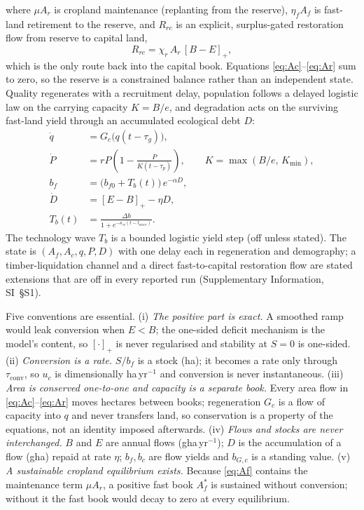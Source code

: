 \documentclass[preprint,12pt,authoryear]{elsarticle}
\newcommand{\pos}[1]{\left[#1\right]_+}
\newcommand{\tconv}{\tau_{\mathrm{conv}}}
\begin{document}
where $\mu A_r$ is cropland maintenance (replanting from the reserve), $\eta_f A_f$ is fast-land retirement to the reserve, and $R_{rc}$ is an explicit, surplus-gated restoration flow from reserve to capital land,
\begin{equation}\label{eq:Rrc}
R_{rc}=\chi_r\,A_r\,\pos{B-E},
\end{equation}
which is the only route back into the capital book. Equations \eqref{eq:Ac}--\eqref{eq:Ar} sum to zero, so the reserve is a constrained balance rather than an independent state. Quality regenerates with a recruitment delay, population follows a delayed logistic law \citep{Pearl1925,Hutchinson1948} on the carrying capacity $K=B/e$, and degradation acts on the surviving fast-land yield through an accumulated ecological debt $D$:
\begin{align}
\dot q&=G_c\big(q(t-\tau_g)\big),\label{eq:q}\\
\dot P&=rP\left(1-\frac{P}{K(t-\tau_p)}\right),\qquad K=\max(B/e,\,K_{\min}),\label{eq:P}\\
b_f&=\big(b_{f0}+T_b(t)\big)\,e^{-\alpha D},\label{eq:bf}\\
\dot D&=\pos{E-B}-\eta D,\label{eq:D}\\
T_b(t)&=\frac{\Delta b}{1+e^{-\kappa_w(t-t_{wave})}}.\label{eq:Tb}
\end{align}
The technology wave $T_b$ is a bounded logistic yield step (off unless stated). The state is $(A_f,A_c,q,P,D)$ with one delay each in regeneration and demography; a timber-liquidation channel and a direct fast-to-capital restoration flow are stated extensions that are off in every reported run (Supplementary Information, SI~\S S1).

Five conventions are essential. (i) \emph{The positive part is exact.} A smoothed ramp would leak conversion when $E<B$; the one-sided deficit mechanism is the model's content, so $\pos{\cdot}$ is never regularised and stability at $S=0$ is one-sided. (ii) \emph{Conversion is a rate.} $S/b_f$ is a stock (ha); it becomes a rate only through $\tconv$, so $u_c$ is dimensionally ha\,yr$^{-1}$ and conversion is never instantaneous. (iii) \emph{Area is conserved one-to-one and capacity is a separate book.} Every area flow in \eqref{eq:Ac}--\eqref{eq:Ar} moves hectares between books; regeneration $G_c$ is a flow of capacity into $q$ and never transfers land, so conservation is a property of the equations, not an identity imposed afterwards. (iv) \emph{Flows and stocks are never interchanged.} $B$ and $E$ are annual flows (gha\,yr$^{-1}$); $D$ is the accumulation of a flow (gha) repaid at rate $\eta$; $b_f,b_c$ are flow yields and $b_{G,c}$ is a standing value. (v) \emph{A sustainable cropland equilibrium exists.} Because \eqref{eq:Af} contains the maintenance term $\mu A_r$, a positive fast book $A_f^*$ is sustained without conversion; without it the fast book would decay to zero at every equilibrium.
\end{document}
